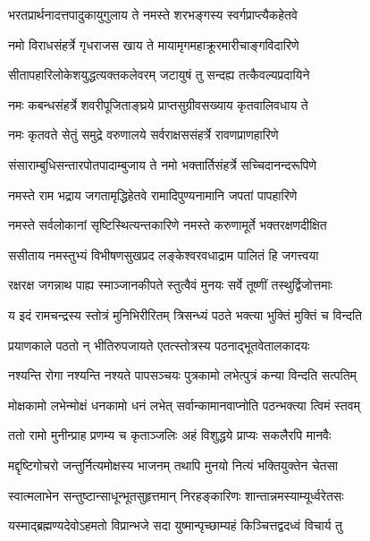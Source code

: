 \twolineshloka
{भरतप्रार्थनादत्तपादुकायुगुलाय ते}
{नमस्ते शरभङ्गस्य स्वर्गप्राप्त्यैकहेतवे}%

\twolineshloka
{नमो विराधसंहर्त्रे गृधराजस खाय ते}
{मायामृगमहाक्रूरमारीचाङ्गविदारिणे}%

\twolineshloka
{सीतापहारिलोकेशयुद्धत्यक्तकलेवरम्}
{जटायुषं तु सन्दह्य तत्कैवल्यप्रदायिने}%

\twolineshloka
{नमः कबन्धसंहर्त्रे शवरीपूजिताङ्घ्रये}
{प्राप्तसुग्रीवसख्याय कृतवालिवधाय ते}%

\twolineshloka
{नमः कृतवते सेतुं समुद्रे वरुणालये}
{सर्वराक्षससंहर्त्रे रावणप्राणहारिणे}%

\twolineshloka
{संसाराम्बुधिसन्तारपोतपादाम्बुजाय ते}
{नमो भक्तार्तिसंहर्त्रे सच्चिदानन्दरूपिणे}%

\twolineshloka
{नमस्ते राम भद्राय जगतामृद्धिहेतवे}
{रामादिपुण्यनामानि जपतां पापहारिणे}%

\twolineshloka
{नमस्ते सर्वलोकानां सृष्टिस्थित्यन्तकारिणे}
{नमस्ते करुणामूर्ते भक्तरक्षणदीक्षित}%

\twolineshloka
{ससीताय नमस्तुभ्यं विभीषणसुखप्रद}
{लङ्केश्वरवधाद्राम पालितं हि जगत्त्वया}%

\twolineshloka
{रक्षरक्ष जगन्नाथ पाह्य स्माञ्जानकीपते}
{स्तुत्वैवं मुनयः सर्वे तूष्णीं तस्थुर्द्विजोत्तमाः}%


\twolineshloka
{य इदं रामचन्द्रस्य स्तोत्रं मुनिभिरीरितम्}
{त्रिसन्ध्यं पठते भक्त्या भुक्तिं मुक्तिं च विन्दति}%

\twolineshloka
{प्रयाणकाले पठतो न् भीतिरुपजायते}
{एतत्स्तोत्रस्य पठनाद्भूतवेतालकादयः}%

\twolineshloka
{नश्यन्ति रोगा नश्यन्ति नश्यते पापसञ्चयः}
{पुत्रकामो लभेत्पुत्रं कन्या विन्दति सत्पतिम्}%

\twolineshloka
{मोक्षकामो लभेन्मोक्षं धनकामो धनं लभेत्}
{सर्वान्कामानवाप्नोति पठन्भक्त्या त्विमं स्तवम्}%

\twolineshloka
{ततो रामो मुनीन्प्राह प्रणम्य च कृताञ्जलिः}
{अहं विशुद्धये प्राप्यः सकलैरपि मानवैः}%

\twolineshloka
{मद्दृष्टिगोचरो जन्तुर्नित्यमोक्षस्य भाजनम्}
{तथापि मुनयो नित्यं भक्तियुक्तेन चेतसा}%

\twolineshloka
{स्वात्मलाभेन सन्तुष्टान्साधून्भूतसुहृत्तमान्}
{निरहङ्कारिणः शान्तान्नमस्याम्यूर्ध्वरेतसः}%

\twolineshloka
{यस्माद्ब्रह्मण्यदेवोऽहमतो विप्रान्भजे सदा}
{युष्मान्पृच्छाम्यहं किञ्चित्तद्वदध्वं विचार्य तु}%

